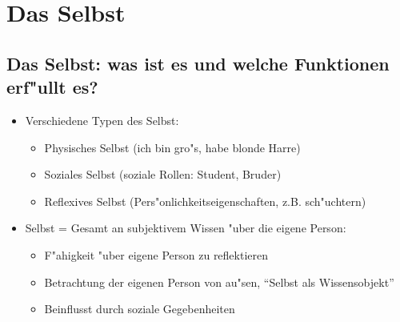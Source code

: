 \section{Das Selbst}
\subsection{Das Selbst: was ist es und welche Funktionen erf"ullt es?}
\begin{itemize}
	\item
		Verschiedene Typen des Selbst:
		\begin{itemize}
			\item
				Physisches Selbst (ich bin gro"s, habe blonde Harre)
			\item
				Soziales Selbst (soziale Rollen: Student, Bruder)
			\item
				Reflexives Selbst (Pers"onlichkeitseigenschaften, z.B. sch"uchtern)
		\end{itemize}
		
	\item
		Selbst = Gesamt an subjektivem Wissen "uber die eigene Person:
		\begin{itemize}
			\item
				F"ahigkeit "uber eigene Person zu reflektieren
			\item
				Betrachtung der eigenen Person von au"sen, \enquote{Selbst als Wissensobjekt}
			\item
				Beinflusst durch soziale Gegebenheiten
		\end{itemize}



\end{itemize}
